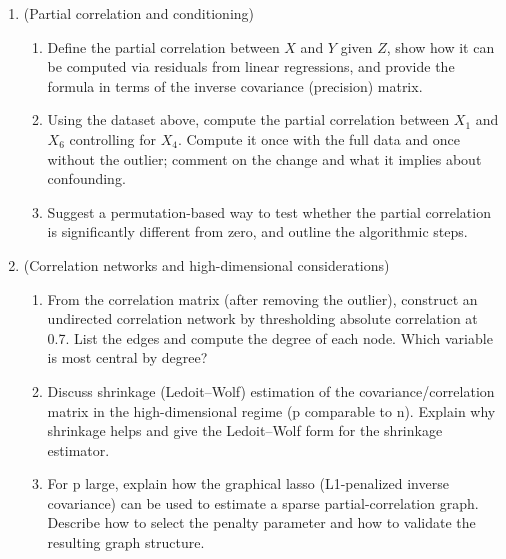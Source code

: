 \documentclass[12pt,a4paper]{article}
\begin{document}
\begin{enumerate}[label=(\arabic*)]
\begin{enumerate}[label=(\alph*)]
    \item Test the significance of each reported correlation using the t-test from part (2) and adjust the p-values for multiple comparisons using both Bonferroni and Benjamini–Hochberg procedures; report which pairs remain significant under each correction (use \(\alpha=0.05\)).
    \item Remove observation 8 (the outlier) and recompute the Pearson correlation matrix and the three top correlations. Compare numerically and interpret which correlations were driven by the outlier.
    \item Compute Spearman rank correlations on the full dataset and compare to Pearson; comment on robustness illustrated by these numbers.
    \end{enumerate}

\item (Partial correlation and conditioning)
    \begin{enumerate}[label=(\alph*)]
    \item Define the partial correlation between \(X\) and \(Y\) given \(Z\), show how it can be computed via residuals from linear regressions, and provide the formula in terms of the inverse covariance (precision) matrix.
    \item Using the dataset above, compute the partial correlation between \(X_1\) and \(X_6\) controlling for \(X_4\). Compute it once with the full data and once without the outlier; comment on the change and what it implies about confounding.
    \item Suggest a permutation-based way to test whether the partial correlation is significantly different from zero, and outline the algorithmic steps.
    \end{enumerate}

\item (Correlation networks and high-dimensional considerations)
    \begin{enumerate}[label=(\alph*)]
    \item From the correlation matrix (after removing the outlier), construct an undirected correlation network by thresholding absolute correlation at 0.7. List the edges and compute the degree of each node. Which variable is most central by degree?
    \item Discuss shrinkage (Ledoit–Wolf) estimation of the covariance/correlation matrix in the high-dimensional regime (p comparable to n). Explain why shrinkage helps and give the Ledoit–Wolf form for the shrinkage estimator.
    \item For p large, explain how the graphical lasso (L1-penalized inverse covariance) can be used to estimate a sparse partial-correlation graph. Describe how to select the penalty parameter and how to validate the resulting graph structure.
    \end{enumerate}
\end{enumerate}

\end{document}
